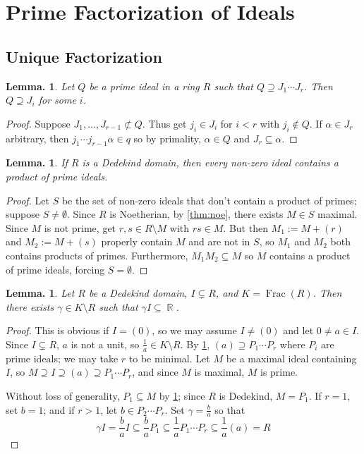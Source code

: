 \documentclass[11pt, a4paper]{memoir}
\DeclareMathOperator{\R}{{\mathbb{R}}}
\theoremstyle{change}
\newtheorem{lemma}[theorem]{Lemma.}
\theoremstyle{plain}
\theoremstyle{nonumberplain}
\newtheorem{proof}{Proof}
\DeclareMathOperator{\Frac}{Frac}
\numberwithin{equation}{section}
\begin{document}
\section{Prime Factorization of Ideals}
\subsection{Unique Factorization}
\begin{lemma}\label{lem:id-cont}
    Let $Q$ be a prime ideal in a ring $R$ such that $Q\supseteq J_1\cdots J_r$.
    Then $Q\supseteq J_i$ for some $i$.
\end{lemma}
\begin{proof}
    Suppose $J_1,\ldots,J_{r-1}\not\subset Q$.
    Thus get $j_i\in J_i$ for $i<r$ with $j_i\notin Q$.
    If $\alpha\in J_r$ arbitrary, then $j_1\cdots j_{r-1}\alpha\in q$ so by primality, $\alpha\in Q$ and $J_r\subseteq\alpha$.
\end{proof}
\begin{lemma}\label{lem:prod-id}
    If $R$ is a Dedekind domain, then every non-zero ideal contains a product of prime ideals.
\end{lemma}
\begin{proof}
    Let $S$ be the set of non-zero ideals that don't contain a product of primes; suppose $S\neq\emptyset$.
    Since $R$ is Noetherian, by \cref{thm:noe}, there exists $M\in S$ maximal.
    Since $M$ is not prime, get $r,s\in R\setminus M$ with $rs\in M$.
    But then $M_1:=M+(r)$ and $M_2:=M+(s)$ properly contain $M$ and are not in $S$, so $M_1$ and $M_2$ both contains products of primes.
    Furthermore, $M_1M_2\subseteq M$ so $M$ contains a product of prime ideals, forcing $S=\emptyset$.
\end{proof}
\begin{lemma}\label{lem:id-frac}
    Let $R$ be a Dedekind domain, $I\subsetneq R$, and $K=\Frac(R)$.
    Then there exists $\gamma\in K\setminus R$ such that $\gamma I\subseteq\R$.
\end{lemma}
\begin{proof}
    This is obvious if $I=(0)$, so we may assume $I\neq(0)$ and let $0\neq a\in I$.
    Since $I\subsetneq R$, $a$ is not a unit, so $\frac{1}{a}\in K\setminus R$.
    By \cref{lem:prod-id}, $(a)\supseteq P_1\cdots P_r$ where $P_i$ are prime ideals; we may take $r$ to be minimal.
    Let $M$ be a maximal ideal containing $I$, so $M\supseteq I\supseteq(a)\supseteq P_1\cdots P_r$, and since $M$ is maximal, $M$ is prime.

    Without loss of generality, $P_1\subseteq M$ by \cref{lem:id-cont}; since $R$ is Dedekind, $M=P_1$.
    If $r=1$, set $b=1$; and if $r>1$, let $b\in P_2\cdots P_r$.
    Set $\gamma=\frac{b}{a}$ so that
    \begin{equation*}
        \gamma I=\frac{b}{a}I\subseteq\frac{b}{a}P_1\subseteq\frac{1}{a}P_1\cdots P_r\subseteq\frac{1}{a}(a)=R
    \end{equation*}
\end{proof}
\end{document}
